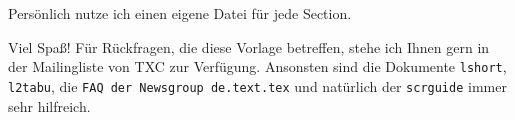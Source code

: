 \documentclass[a4paper,%
twoside,							%
headsepline=true,				%
footsepline=true,				%
headings=normal,
listof=totoc,					%
bibliography=totoc,			%
listof=entryprefix,
]
{scrartcl}
\begin{document}
Persönlich nutze ich einen eigene Datei für jede Section. 

Viel Spaß! Für Rückfragen, die diese Vorlage betreffen, stehe ich Ihnen gern in der Mailingliste von TXC zur Verfügung. Ansonsten sind die Dokumente \texttt{lshort}, \texttt{l2tabu}, die \texttt{FAQ der Newsgroup de.text.tex} und natürlich der \texttt{scrguide} immer sehr hilfreich.

\newpage
\listoftables			%
\newpage
\listoffigures				%
\newpage
\lstlistoflistings
\newpage
%
\nocite{*} %
\newpage
{}
\renewcommand{\bibname}{Literatur}
\nocite{*} %

\printbibliography[nottype = online, title = Literaturverzeichnis,heading	= subbibliography]
\printbibliography[
	type 		= online,						%
	title		= {Online-Quellen},	%
	heading	= subbibliography
]
\end{document}
